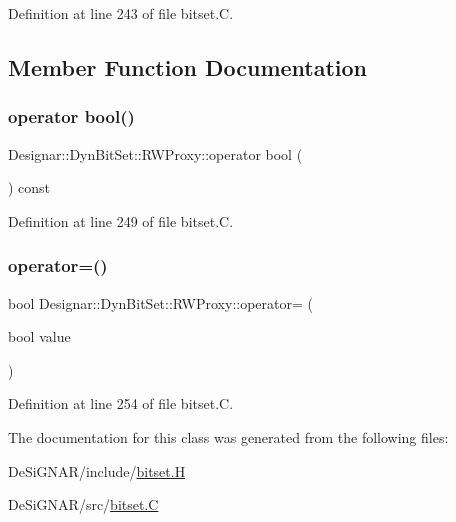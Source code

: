 Definition at line 243 of file bitset.\+C.



\subsection{Member Function Documentation}
\mbox{\label{class_designar_1_1_dyn_bit_set_1_1_r_w_proxy_ae2b7bc44f30f8b75d8fc2306167f9598}} 
\subsubsection{\texorpdfstring{operator bool()}{operator bool()}}
{\footnotesize\ttfamily Designar\+::\+Dyn\+Bit\+Set\+::\+R\+W\+Proxy\+::operator bool (\begin{DoxyParamCaption}{ }\end{DoxyParamCaption}) const}



Definition at line 249 of file bitset.\+C.

\mbox{\label{class_designar_1_1_dyn_bit_set_1_1_r_w_proxy_ad9dff242f5550a97af94c1e4ecd163ad}} 
\subsubsection{\texorpdfstring{operator=()}{operator=()}}
{\footnotesize\ttfamily bool Designar\+::\+Dyn\+Bit\+Set\+::\+R\+W\+Proxy\+::operator= (\begin{DoxyParamCaption}\item[{bool}]{value }\end{DoxyParamCaption})}



Definition at line 254 of file bitset.\+C.



The documentation for this class was generated from the following files\+:\begin{DoxyCompactItemize}
\item 
De\+Si\+G\+N\+A\+R/include/\hyperlink{bitset_8_h}{bitset.\+H}\item 
De\+Si\+G\+N\+A\+R/src/\hyperlink{bitset_8_c}{bitset.\+C}\end{DoxyCompactItemize}
